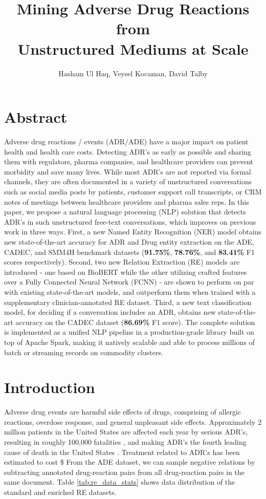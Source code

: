 \documentclass[letterpaper]{article}
\title{Mining Adverse Drug Reactions from \\ Unstructured Mediums at Scale}
\author{
Hasham Ul Haq,
    Veysel Kocaman,
    David Talby
}
\begin{document}
\maketitle

\section{Abstract}
Adverse drug reactions / events (ADR/ADE) have a major impact on patient health and health care costs. Detecting ADR's as early as possible and sharing them with regulators, pharma companies, and healthcare providers can prevent morbidity and save many lives. While most ADR's are not reported via formal channels, they are often documented in a variety of unstructured conversations such as social media posts by patients, customer support call transcripts, or CRM notes of meetings between healthcare providers and pharma sales reps. In this paper, we propose a natural language processing (NLP) solution that detects ADR's in such unstructured free-text conversations, which improves on previous work in three ways. First, a new Named Entity Recognition (NER) model obtains new state-of-the-art accuracy for ADR and Drug entity extraction on the ADE, CADEC, and SMM4H benchmark datasets (\textbf{91.75\%}, \textbf{78.76\%}, and \textbf{83.41\%} F1 scores respectively). Second, two new Relation Extraction (RE) models are introduced - one based on BioBERT while the other utilizing crafted features over a Fully Connected Neural Network (FCNN) - are shown to perform on par with existing state-of-the-art models, and outperform them when trained with a supplementary clinician-annotated RE dataset. Third, a new text classification model, for deciding if a conversation includes an ADR, obtains new state-of-the-art accuracy on the CADEC dataset (\textbf{86.69\%} F1 score). The complete solution is implemented as a unified NLP pipeline in a production-grade library built on top of Apache Spark, making it natively scalable and able to process millions of batch or streaming records on commodity clusters.


\section{Introduction}
Adverse drug events are harmful side effects of drugs, comprising of allergic reactions, overdose response, and general unpleasant side effects. Approximately 2 million patients in the United States are affected each year by serious ADR's, resulting in roughly 100,000 fatalities \cite{leaman2010towards}, and making ADR's the fourth leading cause of death in the United States \cite{giacomini2007good}. Treatment related to ADR's has been estimated to cost \$ From the ADE dataset, we can sample negative relations by subtracting annotated drug-reaction pairs from all drug-reaction pairs in the same document. Table \ref{tab:re_data_stats} shows data distribution of the standard and enriched RE datasets. 
\end{document}
